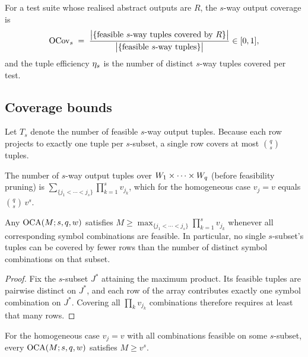 \begin{definition}
\label{def:metrics}
For a test suite whose realised abstract outputs are $R$, the $s$-way output
coverage is
\[
\mathrm{OCov}_s \;=\;
\frac{\bigl|\{\text{feasible $s$-way tuples covered by } R\}\bigr|}
     {\bigl|\{\text{feasible $s$-way tuples}\}\bigr|}\in[0,1],
\]
and the tuple efficiency $\eta_s$ is the number of distinct $s$-way tuples covered
per test.
\end{definition}

\subsection{Coverage bounds}

Let $T_s$ denote the number of feasible $s$-way output tuples. Because each row
projects to exactly one tuple per $s$-subset, a single row covers at most
$\binom{q}{s}$ tuples.

\begin{theorem}
\label{thm:universe}
The number of $s$-way output tuples over $W_1\times\cdots\times W_q$ (before feasibility pruning) is
$\sum_{\{j_1<\cdots<j_s\}} \prod_{k=1}^{s} v_{j_k}$, which for the homogeneous case
$v_j=v$ equals $\binom{q}{s}\,v^{s}$.
\end{theorem}

\begin{theorem}
\label{thm:lb}
Any $\mathrm{OCA}(M;s,q,w)$ satisfies $M \ge \max_{\{j_1<\cdots<j_s\}}\prod_{k=1}^{s}
v_{j_k}$ whenever all corresponding symbol combinations are feasible. In
particular, no single $s$-subset's tuples can be covered by fewer rows than the
number of distinct symbol combinations on that subset.
\end{theorem}

\begin{proof}
Fix the $s$-subset $J^{*}$ attaining the maximum product. Its feasible tuples are
pairwise distinct on $J^{*}$, and each row of the array contributes exactly one
symbol combination on $J^{*}$. Covering all $\prod_{k}v_{j_k}$ combinations
therefore requires at least that many rows.
\end{proof}

\begin{corollary}[$M \ge v^{s}$]
\label{cor:lb}
For the homogeneous case $v_j=v$ with all combinations feasible on some
$s$-subset, every $\mathrm{OCA}(M;s,q,w)$ satisfies $M \ge v^{s}$.
\end{corollary}

